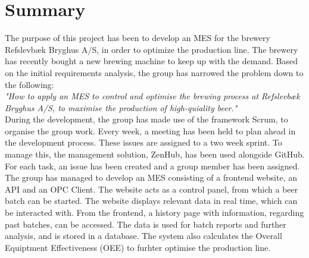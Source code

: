 \section{Summary}
The purpose of this project has been to develop an MES for the brewery
Refslevbæk Bryghus A/S, in order to optimize the production line. The brewery
has recently bought a new brewing machine to keep up with the demand.
Based on the initial requirements analysis, the group has narrowed the problem
down to the following:\\

\textit{"How to apply an MES to control and optimise the brewing process at
Refslevbæk Bryghus A/S, to maximise the production of high-quiality beer."}\\

During the development, the group has made use of the framework Scrum, to
organise the group work. Every week, a meeting has been held to plan ahead in
the development process. These issues are assigned to a two week sprint. To
manage this, the management solution, ZenHub, has been used alongside GitHub.
For each task, an issue has been created and a group member has been assigned.\\

The group has managed to develop an MES consisting of a frontend
website, an API and an OPC Client. The website acts as a control panel, from
which a beer batch can be started. The website displays relevant data in real
time, which can be interacted with. From the frontend, a history page with 
information, regarding past batches, can be accessed. The data is used for batch
reports and further analysis, and is stored in a database. The system also
calculates the Overall Equiptment Effectiveness (OEE) to furhter optimise the
production line.